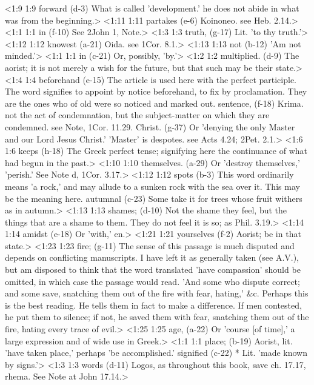<1:9 1:9  forward (d-3)  What is called 'development.' he does not abide in what was  from the beginning.>
<1:11 1:11  partakes (e-6)  Koinoneo. see Heb. 2.14.>
<1:1 1:1  in (f-10)  See 2John 1, Note.>
<1:3 1:3  truth, (g-17)  Lit. 'to thy truth.'>
<1:12 1:12  knowest (a-21)  Oida. see 1Cor. 8.1.>
<1:13 1:13  not (b-12)  'Am not minded.'>
<1:1 1:1  in (c-21)  Or, possibly, 'by.'>
<1:2 1:2  multiplied. (d-9)  The aorist; it is not merely a wish for the future, but that  such may be their state.>
<1:4 1:4  beforehand (e-15)  The article is used here with the perfect participle. The  word signifies to appoint by notice beforehand, to fix by  proclamation. They are the ones who of old were so noticed  and marked out.
  sentence, (f-18)  Krima. not the act of condemnation, but the subject-matter  on which they are condemned. see Note, 1Cor. 11.29.
  Christ. (g-37)  Or 'denying the only Master and our Lord Jesus Christ.'  'Master' is despotes. see Acts 4.24; 2Pet. 2.1.>
<1:6 1:6  keeps (h-18)  The Greek perfect tense; signifying here the continuance of  what had begun in the past.>
<1:10 1:10  themselves. (a-29)  Or 'destroy themselves,' 'perish.' See Note d, 1Cor. 3.17.>
<1:12 1:12  spots (b-3)  This word ordinarily means 'a rock,' and may allude to a  sunken rock with the sea over it. This may be the meaning here.
  autumnal (c-23)  Some take it for trees whose fruit withers as in autumn.>
<1:13 1:13  shames; (d-10)  Not the shame they feel, but the things that are a shame to  them. They do not feel it is so; as Phil. 3.19.>
<1:14 1:14  amidst (e-18)  Or 'with,' en.>
<1:21 1:21  yourselves (f-2)  Aorist; be in that state.>
<1:23 1:23  fire; (g-11)  The sense of this passage is much disputed and depends on  conflicting manuscripts. I have left it as generally taken (see  A.V.), but am disposed to think that the word translated 'have  compassion' should be omitted, in which case the passage would  read. 'And some who dispute correct; and some save, snatching  them out of the fire with fear, hating,' &c. Perhaps this is  the best reading. He tells them in fact to make a difference.  If men contested, he put them to silence; if not, he saved them  with fear, snatching them out of the fire, hating every trace  of evil.>
<1:25 1:25  age, (a-22)  Or 'course [of time],' a large expression and of wide use in  Greek.>
<1:1 1:1  place; (b-19)  Aorist, lit. 'have taken place,' perhaps 'be accomplished.'
  signified (c-22)  * Lit. 'made known by signs.'>
<1:3 1:3  words (d-11)  Logos, as throughout this book, save ch. 17.17, rhema.  See Note at John 17.14.>
